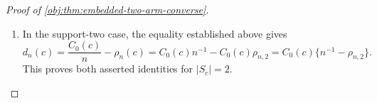 \begin{proof}[Proof of \cref{obj:thm:embedded-two-arm-converse}]
\begin{enumerate}
\item In the support-two case, the equality established above gives
\[
d_n(c)
=
\frac{C_0(c)}{n}-\rho_n(c)
=
C_0(c)n^{-1}-C_0(c)\rho_{n,2}
=
C_0(c)\{n^{-1}-\rho_{n,2}\}.
\]
This proves both asserted identities for \(|S_c|=2\).
\end{enumerate}
\end{proof}
